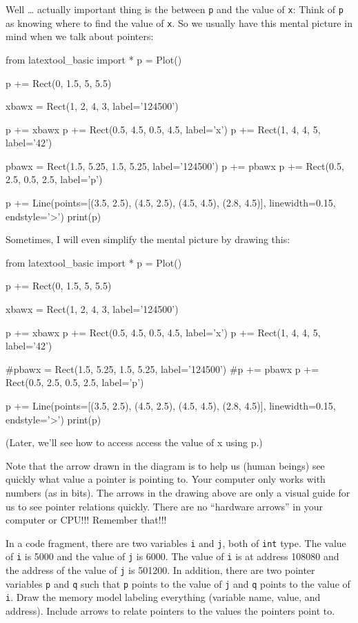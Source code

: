Well \ldots{} actually important thing is the  between \texttt{p} and the value of \texttt{x}: Think of \texttt{p} as knowing where to find the value of \texttt{x}. So we usually have this mental picture in mind when we talk about pointers:

\begin{python}
from latextool_basic import *
p = Plot()

p += Rect(0, 1.5, 5, 5.5)

xbawx = Rect(1, 2, 4, 3, label='124500')

p += xbawx
p += Rect(0.5, 4.5, 0.5, 4.5, label='x')
p += Rect(1, 4, 4, 5, label='42')

pbawx = Rect(1.5, 5.25, 1.5, 5.25, label='124500')
p += pbawx
p += Rect(0.5, 2.5, 0.5, 2.5, label='p')

p += Line(points=[(3.5, 2.5), (4.5, 2.5), (4.5, 4.5), (2.8, 4.5)], linewidth=0.15, endstyle='>')
print(p)
\end{python}

Sometimes, I will even simplify the mental picture by drawing this:

\begin{python}
from latextool_basic import *
p = Plot()

p += Rect(0, 1.5, 5, 5.5)

xbawx = Rect(1, 2, 4, 3, label='124500')

p += xbawx
p += Rect(0.5, 4.5, 0.5, 4.5, label='x')
p += Rect(1, 4, 4, 5, label='42')

#pbawx = Rect(1.5, 5.25, 1.5, 5.25, label='124500')
#p += pbawx
p += Rect(0.5, 2.5, 0.5, 2.5, label='p')

p += Line(points=[(3.5, 2.5), (4.5, 2.5), (4.5, 4.5), (2.8, 4.5)], linewidth=0.15, endstyle='>')
print(p)
\end{python}

(Later, we'll see how to access access the value of x using p.)

Note that the arrow drawn in the diagram is to help us (human beings) see quickly what value a pointer is pointing to. Your computer only works with numbers (as in bits). The arrows in the drawing above are only a visual guide for us to see pointer relations quickly. There are no ``hardware arrows'' in your computer or CPU!!! Remember that!!!

\begin{ex}
In a code fragment, there are two variables \texttt{i} and \texttt{j}, both of \texttt{int} type. The value of \texttt{i} is 5000 and the value of \texttt{j} is 6000. The value of \texttt{i} is at address 108080 and the address of the value of \texttt{j} is 501200. In addition, there are two pointer variables \texttt{p} and \texttt{q} such that \texttt{p} points to the value of \texttt{j} and \texttt{q} points to the value of \texttt{i}. Draw the memory model labeling everything (variable name, value, and address). Include arrows to relate pointers to the values the pointers point to.
\end{ex}


